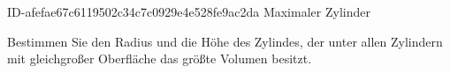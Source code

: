 \begin{exercise}
      {ID-afefae67c6119502c34c7c0929e4e528fe9ac2da}
      {Maximaler Zylinder}
  \ifproblem\problem\par
    Bestimmen Sie den Radius und die Höhe des Zylindes, der unter allen Zylindern
    mit gleichgroßer Oberfläche das größte Volumen besitzt.
  \fi
\end{exercise}
